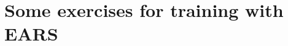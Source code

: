 \documentclass[aspectratio=169]{beamer}
\begin{document}



\section*{Some exercises for training with EARS}
\end{document}
